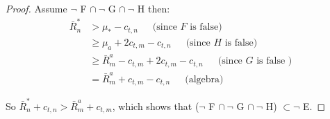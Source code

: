 \documentclass[11pt]{article}
\begin{document}
\begin{proof} Assume $\neg $ F $\cap \  \neg$ G $\cap \  \neg$ H then:
  \begin{align*}
 \bar R^*_{n} &> \mu_* - c_{t,n}\hspace{18pt}\text{(since } F\text{ is false)}\\
 &\geq   \mu_a + 2c_{t,m} - c_{t,n} 	\hspace{18pt} \text{(since } H
    \text{ is false)}\\
 &\geq   \bar R^a_{m} - c_{t,m} + 2c_{t,m} - c_{t,n} 	\hspace{18pt}
    \text{(since } G\text{ is false )}\\
 &=  \bar R^a_{m} + c_{t,m} - c_{t,n}  \hspace{18pt} \text{(algebra)}
  \end{align*}

So $\bar R^*_{n} + c_{t,n} > \bar R^a_{m} + c_{t,m}$, which shows that ($\neg $ F $\cap \  \neg$ G $\cap \  \neg$ H) $ \subset \neg $ E.\end{proof} 
\end{document}
